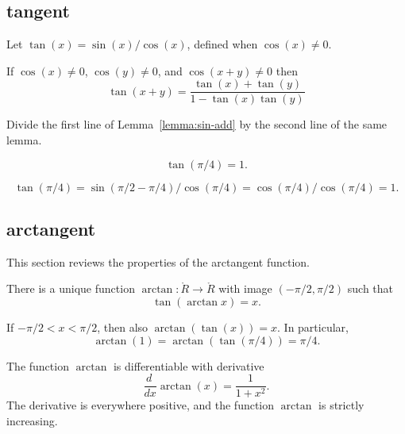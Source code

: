 \subsection{tangent}
\label{sec:tangent}

\begin{definition}[tangent]\label{def:tan}
Let $\tan(x) = \sin(x)/\cos(x)$, defined when $\cos(x)\ne0$.
%
%
\end{definition}


\begin{lemma}\label{lemma:tan-add}
    If $\cos(x)\ne 0$, $\cos(y)\ne 0$, and $\cos(x+y)\ne0$ then
    $$\tan(x+y) = \frac{\tan(x) + \tan(y) }{ 1 - \tan(x)\tan(y)}$$
\end{lemma}
%

\begin{proved}
  Divide the first line of Lemma~\ref{lemma:sin-add} by the second
  line of the same lemma.
\swallowed\end{proved}

\begin{lemma}\label{lemma:tan-pi4}
    $$\tan(\pi/4) = 1.$$
\end{lemma}

\begin{proved}
    $$\tan(\pi/4) = \sin(\pi/2-\pi/4)/\cos(\pi/4) =
    \cos(\pi/4)/\cos(\pi/4) = 1.$$
\swallowed\end{proved}


\subsection{arctangent}

This section reviews the properties of the arctangent function.

\begin{definition}[arctangent]\label{def:arctan}
There is a unique function $\arctan:\ring{R}\to\ring{R}$ with
image $(-\pi/2,\pi/2)$ such that
    $$\tan(\arctan x) =x.$$
%
\end{definition}

If $-\pi/2 < x < \pi/2$, then also $\arctan(\tan(x)) = x$. In
particular,
    $$\arctan(1) = \arctan(\tan(\pi/4)) = \pi/4.$$


The function $\arctan$ is differentiable with derivative%
    $$\frac{d\phantom{~}} {dx} \arctan(x) = \frac{1}{1 + x^2}.$$
The derivative is everywhere positive, and the function $\arctan$ is
strictly increasing.
%


